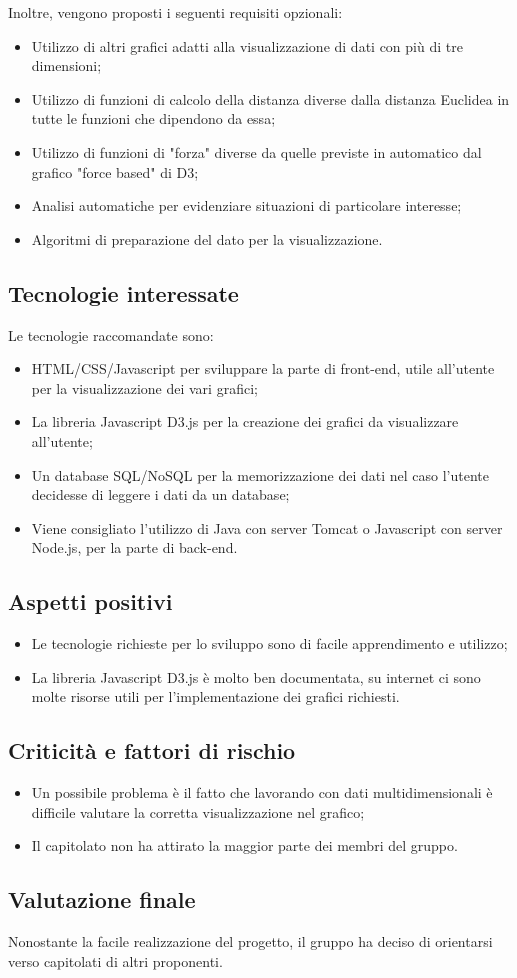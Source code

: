 Inoltre, vengono proposti i seguenti requisiti opzionali:
\begin{itemize}
\item Utilizzo di altri grafici adatti alla visualizzazione di dati con più di tre dimensioni;
\item Utilizzo di funzioni di calcolo della distanza diverse dalla distanza Euclidea in tutte le funzioni che dipendono da essa;
\item Utilizzo di funzioni di "forza" diverse da quelle previste in automatico dal grafico "force based" di D3;
\item Analisi automatiche per evidenziare situazioni di particolare interesse;
\item Algoritmi di preparazione del dato per la visualizzazione.
\end{itemize}

\subsection{Tecnologie interessate}
Le tecnologie raccomandate sono:
\begin{itemize}
\item HTML/CSS/Javascript per sviluppare la parte di front-end, utile all'utente per la visualizzazione dei vari grafici;
\item La libreria Javascript D3.js per la creazione dei grafici da visualizzare all'utente;
\item Un database SQL/NoSQL per la memorizzazione dei dati nel caso l'utente decidesse di leggere i dati da un database;
\item Viene consigliato l’utilizzo di Java con server Tomcat o Javascript con server Node.js, per la parte di back-end.
\end{itemize}

\subsection{Aspetti positivi}
\begin{itemize}
\item Le tecnologie richieste per lo sviluppo sono di facile apprendimento e utilizzo;
\item La libreria Javascript D3.js è molto ben documentata, su internet ci sono molte risorse utili per l'implementazione dei grafici richiesti.
\end{itemize}

\subsection{Criticità e fattori di rischio}
\begin{itemize}
\item Un possibile problema è il fatto che lavorando con dati multidimensionali è difficile valutare la corretta visualizzazione nel grafico;
\item Il capitolato non ha attirato la maggior parte dei membri del gruppo.
\end{itemize}

\subsection{Valutazione finale}
Nonostante la facile realizzazione del progetto, il gruppo ha deciso di orientarsi verso capitolati di altri proponenti.